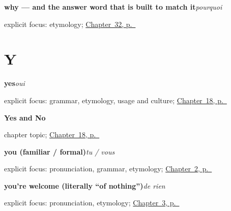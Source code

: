 \noindent\begin{minipage}[t]{\linewidth}
\raggedright
\textbf{why — and the answer word that is built to match it}\enspace\emph{pourquoi}\par
\footnotesize explicit focus: etymology; \hyperref[ch:fr-questions]{Chapter~32, p.~\pageref*{ch:fr-questions}}
\end{minipage}\par\smallskip

\section*{Y}

\noindent\begin{minipage}[t]{\linewidth}
\raggedright
\textbf{yes}\enspace\emph{oui}\par
\footnotesize explicit focus: grammar, etymology, usage and culture; \hyperref[ch:fr-yes-and-no]{Chapter~18, p.~\pageref*{ch:fr-yes-and-no}}
\end{minipage}\par\smallskip

\noindent\begin{minipage}[t]{\linewidth}
\raggedright
\textbf{Yes and No}\par
\footnotesize chapter topic; \hyperref[ch:fr-yes-and-no]{Chapter~18, p.~\pageref*{ch:fr-yes-and-no}}
\end{minipage}\par\smallskip

\noindent\begin{minipage}[t]{\linewidth}
\raggedright
\textbf{you (familiar / formal)}\enspace\emph{tu / vous}\par
\footnotesize explicit focus: pronunciation, grammar, etymology; \hyperref[ch:introductions]{Chapter~2, p.~\pageref*{ch:introductions}}
\end{minipage}\par\smallskip

\noindent\begin{minipage}[t]{\linewidth}
\raggedright
\textbf{you're welcome (literally \textquotedblleft{}of nothing\textquotedblright{})}\enspace\emph{de rien}\par
\footnotesize explicit focus: pronunciation, etymology; \hyperref[ch:how-are-you]{Chapter~3, p.~\pageref*{ch:how-are-you}}
\end{minipage}\par\smallskip
